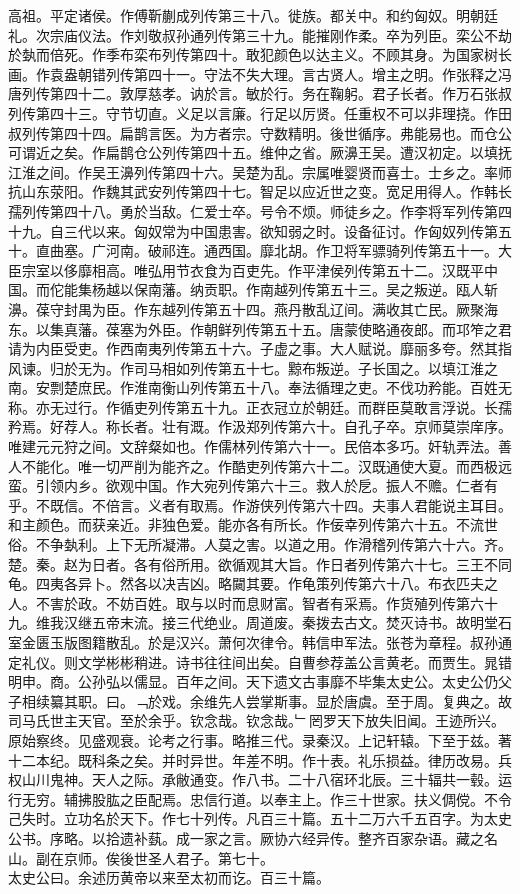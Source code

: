 \documentclass{zhvt-classic}
\begin{document}
高祖。平定诸侯。作傅靳蒯成列传第三十八。徙族。都关中。和约匈奴。明朝廷礼。次宗庙仪法。作刘敬叔孙通列传第三十九。能摧刚作柔。卒为列臣。栾公不劫於埶而倍死。作季布栾布列传第四十。敢犯颜色以达主义。不顾其身。为国家树长画。作袁盎朝错列传第四十一。守法不失大理。言古贤人。增主之明。作张释之冯唐列传第四十二。敦厚慈孝。讷於言。敏於行。务在鞠躬。君子长者。作万石张叔列传第四十三。守节切直。义足以言廉。行足以厉贤。任重权不可以非理挠。作田叔列传第四十四。扁鹊言医。为方者宗。守数精明。後世循序。弗能易也。而仓公可谓近之矣。作扁鹊仓公列传第四十五。维仲之省。厥濞王吴。遭汉初定。以填抚江淮之间。作吴王濞列传第四十六。吴楚为乱。宗属唯婴贤而喜士。士乡之。率师抗山东荥阳。作魏其武安列传第四十七。智足以应近世之变。宽足用得人。作韩长孺列传第四十八。勇於当敌。仁爱士卒。号令不烦。师徒乡之。作李将军列传第四十九。自三代以来。匈奴常为中国患害。欲知弱之时。设备征讨。作匈奴列传第五十。直曲塞。广河南。破祁连。通西国。靡北胡。作卫将军骠骑列传第五十一。大臣宗室以侈靡相高。唯弘用节衣食为百吏先。作平津侯列传第五十二。汉既平中国。而佗能集杨越以保南藩。纳贡职。作南越列传第五十三。吴之叛逆。瓯人斩濞。葆守封禺为臣。作东越列传第五十四。燕丹散乱辽间。满收其亡民。厥聚海东。以集真藩。葆塞为外臣。作朝鲜列传第五十五。唐蒙使略通夜郎。而邛笮之君请为内臣受吏。作西南夷列传第五十六。子虚之事。大人赋说。靡丽多夸。然其指风谏。归於无为。作司马相如列传第五十七。黥布叛逆。子长国之。以填江淮之南。安剽楚庶民。作淮南衡山列传第五十八。奉法循理之吏。不伐功矜能。百姓无称。亦无过行。作循吏列传第五十九。正衣冠立於朝廷。而群臣莫敢言浮说。长孺矜焉。好荐人。称长者。壮有溉。作汲郑列传第六十。自孔子卒。京师莫崇庠序。唯建元元狩之间。文辞粲如也。作儒林列传第六十一。民倍本多巧。奸轨弄法。善人不能化。唯一切严削为能齐之。作酷吏列传第六十二。汉既通使大夏。而西极远蛮。引领内乡。欲观中国。作大宛列传第六十三。救人於戹。振人不赡。仁者有乎。不既信。不倍言。义者有取焉。作游侠列传第六十四。夫事人君能说主耳目。和主颜色。而获亲近。非独色爱。能亦各有所长。作佞幸列传第六十五。不流世俗。不争埶利。上下无所凝滞。人莫之害。以道之用。作滑稽列传第六十六。齐。楚。秦。赵为日者。各有俗所用。欲循观其大旨。作日者列传第六十七。三王不同龟。四夷各异卜。然各以决吉凶。略闚其要。作龟策列传第六十八。布衣匹夫之人。不害於政。不妨百姓。取与以时而息财富。智者有采焉。作货殖列传第六十九。维我汉继五帝末流。接三代绝业。周道废。秦拨去古文。焚灭诗书。故明堂石室金匮玉版图籍散乱。於是汉兴。萧何次律令。韩信申军法。张苍为章程。叔孙通定礼仪。则文学彬彬稍进。诗书往往间出矣。自曹参荐盖公言黄老。而贾生。晁错明申。商。公孙弘以儒显。百年之间。天下遗文古事靡不毕集太史公。太史公仍父子相续纂其职。曰。﹁於戏。余维先人尝掌斯事。显於唐虞。至于周。复典之。故司马氏世主天官。至於余乎。钦念哉。钦念哉。﹂罔罗天下放失旧闻。王迹所兴。原始察终。见盛观衰。论考之行事。略推三代。录秦汉。上记轩辕。下至于兹。著十二本纪。既科条之矣。并时异世。年差不明。作十表。礼乐损益。律历改易。兵权山川鬼神。天人之际。承敝通变。作八书。二十八宿环北辰。三十辐共一毂。运行无穷。辅拂股肱之臣配焉。忠信行道。以奉主上。作三十世家。扶义倜傥。不令己失时。立功名於天下。作七十列传。凡百三十篇。五十二万六千五百字。为太史公书。序略。以拾遗补蓺。成一家之言。厥协六经异传。整齐百家杂语。藏之名山。副在京师。俟後世圣人君子。第七十。\\
\hspace*{2em}太史公曰。余述历黄帝以来至太初而讫。百三十篇。\\
\end{document}
